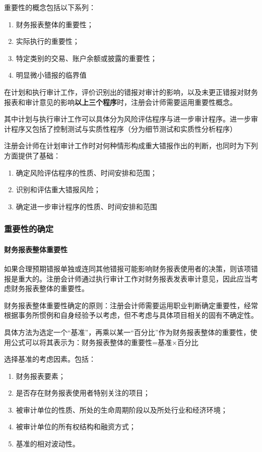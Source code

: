 \documentclass[UTF8,12pt]{ctexart}
\numberwithin{equation}{section} %
\numberwithin{figure}{section}
\numberwithin{table}{section}
\begin{document}
	
	重要性的概念包括以下系列：
	\begin{enumerate}
		\item 财务报表整体的重要性；
		
		\item 实际执行的重要性；
		
		\item 特定类别的交易、账户余额或披露的重要性；
		
		\item 明显微小错报的临界值
	\end{enumerate}

	
	在计划和执行审计工作，评价识别出的错报对审计的影响，以及未更正错报对财务报表和审计意见的影响\textbf{以上三个程序}时，注册会计师需要运用重要性概念。
	
	其中计划与执行审计工作可以具体分为风险评估程序与进一步审计程序。进一步审计程序又包括了控制测试与实质性程序（分为细节测试和实质性分析程序）
	
	注册会计师在计划审计工作时对何种情形构成重大错报作出的判断，也同时为下列方面提供了基础：
	\begin{enumerate}
		\item 确定风险评估程序的性质、时间安排和范围；
	
		\item 识别和评估重大错报风险；
	
		\item 确定进一步审计程序的性质、时间安排和范围
		
	\end{enumerate}
	
	\subsubsection{重要性的确定}
	\paragraph{财务报表整体重要性}
	如果合理预期错报单独或连同其他错报可能影响财务报表使用者的决策，则该项错报是重大的。注册会计师通过执行审计工作对财务报表发表审计意见，因此应当考虑财务报表整体的重要性。
	
	
	财务报表整体重要性确定的原则：注册会计师需要运用职业判断确定重要性，经常根据事务所惯例和自身经验予以考虑，但不考虑与具体项目相关的固有不确定性。
	
	具体方法为选定一个“基准”，再乘以某一“百分比”作为财务报表整体的重要性，使用公式可以将其表示为：财务报表整体的重要性=基准×百分比
	
	选择基准的考虑因素。包括：
	\begin{enumerate}
		\item 财务报表要素；
		
		\item 是否存在财务报表使用者特别关注的项目；
		
		\item 被审计单位的性质、所处的生命周期阶段以及所处行业和经济环境；
		
		\item 被审计单位的所有权结构和融资方式；
		
		\item 基准的相对波动性。
	\end{enumerate}
	
\end{document}
